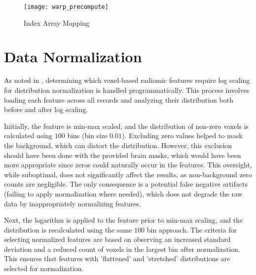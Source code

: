 \begin{figure}[H]
\centering
\texttt{[image: warp\_precompute]}
\caption{Index Array Mapping}
\end{figure}

\section{Data Normalization}
\label{app:imp-norm}

As noted in , determining which voxel-based radiomic features require log scaling for distribution normalization is handled programmatically. This process involves loading each feature across all records and analyzing their distribution both before and after log scaling.\par
Initially, the feature is min-max scaled, and the distribution of non-zero voxels is calculated using $100$ bins (bin size $0.01$). Excluding zero values helped to mask the background, which can distort the distribution. However, this exclusion should have been done with the provided brain masks, which would have been more appropriate since zeros could naturally occur in the features. This oversight, while suboptimal, does not significantly affect the results, as non-background zero counts are negligible. The only consequence is a potential false negative artifacts (failing to apply normalization where needed), which does not degrade the raw data by inappropriately normalizing features.\par
Next, the logarithm is applied to the feature prior to min-max scaling, and the distribution is recalculated using the same $100$ bin approach. The criteria for selecting normalized features are based on observing an increased standard deviation and a reduced count of voxels in the largest bin after normalization. This ensures that features with 'flattened' and 'stretched' distributions are selected for normalization.







